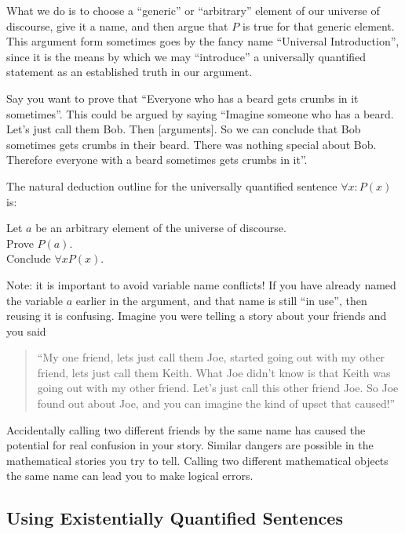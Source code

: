 What we do is to choose a ``generic'' or ``arbitrary'' element of our universe of discourse, give it a name, and then argue that $P$ is true for that generic element.  This argument form sometimes goes by the fancy name ``Universal Introduction'', since it is the means by which we may ``introduce'' a universally quantified statement as an established truth in our argument.

Say you want to prove that ``Everyone who has a beard gets crumbs in it sometimes''.  This could be argued by saying ``Imagine someone who has a beard. Let's just call them Bob.  Then [arguments].  So we can conclude that Bob sometimes gets crumbs in their beard.  There was nothing special about Bob.  Therefore everyone with a beard sometimes gets crumbs in it''.

The natural deduction outline for the universally quantified sentence  $\forall x: P(x)$ is:

\begin{fitch*}
	\textrm{Let $a$ be an arbitrary element of the universe of discourse.}\\
	\textrm{Prove $P(a)$}.\\
	\textrm{Conclude $\forall x P(x)$.}
\end{fitch*}

Note:  it is important to avoid variable name conflicts!  If you have already named the variable $a$ earlier in the argument, and that name is still ``in use'', then reusing it is confusing.  Imagine you were telling a story about your friends and you said

\begin{quote}
``My one friend, lets just call them Joe, started going out with my other friend, lets just call them Keith.  What Joe didn't know is that Keith was going out with my other friend.  Let's just call this other friend Joe.  So Joe found out about Joe, and you can imagine the kind of upset that caused!''
\end{quote}

Accidentally calling two different friends by the same name has caused the potential for real confusion in your story.  Similar dangers are possible in the mathematical stories you try to tell.  Calling two different mathematical objects the same name can lead you to make logical errors.

\subsection{Using Existentially Quantified Sentences}

